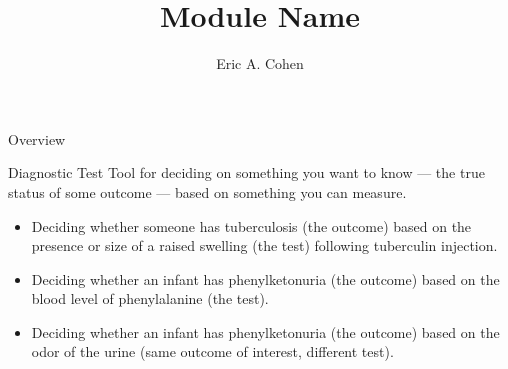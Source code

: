 

\title{Module Name}
\newcommand{\ModuleShortname}{shortName}
\author{Eric A. Cohen}
\newcommand{\LicenseText}{Made available under the Creative Commons Attribution-ShareAlike 3.0 Unported License: http://creativecommons.org/licenses/by-sa/3.0/deed.en\textunderscore US }
\newcommand{\Instructor}{}
\newcommand{\Course}{}






\begin{frame}[plain]
	\titlepage
\end{frame}






\begin{frame}{Overview}

	\begin{block}{Diagnostic Test}
		Tool for deciding on something you want to know --- the true status of some outcome --- based on something you can measure.

		\begin{itemize}

			\item{Deciding whether someone has tuberculosis (the outcome) based on the presence or size of a raised swelling (the test) following tuberculin injection.}

			\item{Deciding whether an infant has phenylketonuria (the outcome) based on the blood level of phenylalanine (the test).}

			\item{Deciding whether an infant has phenylketonuria (the outcome) based on the odor of the urine (same outcome of interest, different test).}
		\end{itemize}

	\end{block}

\end{frame}



